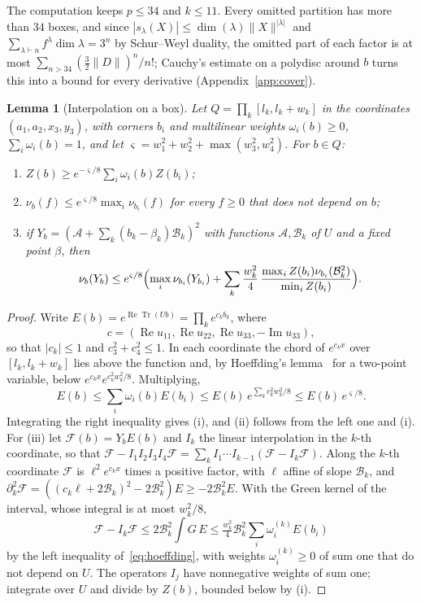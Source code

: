 \documentclass[aps,prd,twocolumn,superscriptaddress,nofootinbib,longbibliography,floatfix,amsmath,amssymb,10pt]{revtex4-2}
\newtheorem{lemma}[theorem]{Lemma}
\theoremstyle{definition}
\theoremstyle{remark}
\newcommand{\ReTr}{\operatorname{Re}\operatorname{Tr}}
\begin{document}
The computation keeps $p\le34$ and $k\le11$. Every omitted partition has
more than $34$ boxes, and since $|s_\lambda(X)|\le\dim(\lambda)\|X\|^{|\lambda|}$ and
$\sum_{\lambda\vdash n}f^\lambda\dim\lambda=3^n$ by Schur--Weyl duality, the omitted
part of each factor is at most $\sum_{n>34}(\frac32\|D\|)^n/n!$; Cauchy's
estimate on a polydisc around $b$ turns this into a bound for every
derivative (Appendix~\ref{app:cover}).

\begin{lemma}[Interpolation on a box]\label{lem:boxes}
Let $Q=\prod_k[l_k,l_k+w_k]$ in the coordinates $(a_1,a_2,x_3,y_3)$, with
corners $b_i$ and multilinear weights $\omega_i(b)\ge0$, $\sum_i\omega_i(b)=1$,
and let $\varsigma=w_1^2+w_2^2+\max(w_3^2,w_4^2)$. For $b\in Q$:
\begin{enumerate}[label=\textup{(\roman*)},leftmargin=*]
\item $Z(b)\ge e^{-\varsigma/8}\sum_i\omega_i(b)Z(b_i)$;
\item $\nu_b(f)\le e^{\varsigma/8}\max_i\nu_{b_i}(f)$ for every $f\ge0$ that
does not depend on $b$;
\item if $Y_b=(\mathcal A+\sum_k(b_k-\beta_k)\mathcal B_k)^2$ with functions
$\mathcal A,\mathcal B_k$ of $U$ and a fixed point $\beta$, then
\[
\nu_b(Y_b)\le e^{\varsigma/8}\Bigl(\max_i\nu_{b_i}(Y_{b_i})+\sum_k
\frac{w_k^2}4\,\frac{\max_iZ(b_i)\nu_{b_i}(\mathcal B_k^2)}{\min_iZ(b_i)}\Bigr).
\]
\end{enumerate}
\end{lemma}

\begin{proof}
Write $E(b)=e^{\ReTr(Ub)}=\prod_ke^{c_kb_k}$, where
\[
c=(\operatorname{Re}u_{11},\operatorname{Re}u_{22},\operatorname{Re}u_{33},
-\operatorname{Im}u_{33}),
\]
so that $|c_k|\le1$ and $c_3^2+c_4^2\le1$. In each coordinate the chord of $e^{c_kx}$
over $[l_k,l_k+w_k]$ lies above the function and, by Hoeffding's
lemma~\cite{Hoe63} for a two-point variable, below $e^{c_kx}e^{c_k^2w_k^2/8}$.
Multiplying,
\begin{equation}\label{eq:hoeffding}
E(b)\le\sum_i\omega_i(b)E(b_i)\le E(b)\,e^{\sum_kc_k^2w_k^2/8}\le E(b)\,
e^{\varsigma/8}.
\end{equation}
Integrating the right inequality gives (i), and (ii) follows from the left
one and (i). For (iii) let $\mathcal F(b)=Y_bE(b)$ and $I_k$ the linear
interpolation in the $k$-th coordinate, so that $\mathcal F-I_1I_2I_3I_4
\mathcal F=\sum_kI_1\cdots I_{k-1}(\mathcal F-I_k\mathcal F)$. Along the $k$-th
coordinate $\mathcal F$ is $\ell^2e^{c_kx}$ times a positive factor, with $\ell$
affine of slope $\mathcal B_k$, and $\partial_k^2\mathcal F=((c_k\ell+2\mathcal
B_k)^2-2\mathcal B_k^2)E\ge-2\mathcal B_k^2E$. With the Green kernel of the
interval, whose integral is at most $w_k^2/8$,
\[
\mathcal F-I_k\mathcal F\le2\mathcal B_k^2\int G\,E\le\tfrac{w_k^2}4\mathcal
B_k^2\sum_i\omega_i^{(k)}E(b_i)
\]
by the left inequality of~\eqref{eq:hoeffding}, with weights $\omega_i^{(k)}
\ge0$ of sum one that do not depend on $U$. The operators $I_j$ have
nonnegative weights of sum one; integrate over $U$ and divide by $Z(b)$,
bounded below by (i).
\end{proof}
\end{document}
